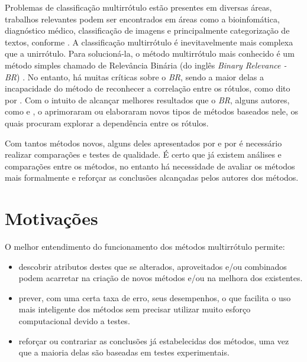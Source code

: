 Problemas de classificação multirrótulo estão presentes em diversas áreas, trabalhos relevantes podem
ser encontrados em áreas como a bioinfomática, diagnóstico médico, classificação de imagens e principalmente
categorização de textos, conforme \cite{carvalho2009}. A classificação multirrótulo é inevitavelmente
mais complexa que a unirrótulo. Para solucioná-la, o método multirrótulo mais conhecido é um método simples chamado de
Relevância Binária (do inglês \textit{Binary Relevance - BR}) \cite{carvalho2009}. 
No entanto, há muitas críticas sobre o \textit{BR}, sendo a maior delas a incapacidade do método de reconhecer
a correlação entre os rótulos, como dito por \cite{pcc2010}.
Com o intuito de alcançar melhores resultados que o \textit{BR}, alguns autores, como \cite{cc2009} e \cite{dbr2014},
o aprimoraram ou elaboraram novos tipos de métodos baseados nele,
os quais procuram explorar a dependência entre os rótulos. 

Com tantos métodos novos, alguns deles apresentados por \cite{carvalho2009}
e por \cite{cc2009} é necessário realizar comparações e testes de qualidade.
É certo que já existem análises e comparações entre os métodos,
no entanto há necessidade de avaliar os métodos mais formalmente
e reforçar as conclusões alcançadas pelos autores dos métodos.

\section{Motivações}
O melhor entendimento do funcionamento dos métodos multirrótulo permite:
\begin{itemize}
 \item descobrir atributos destes que se alterados, aproveitados
 e/ou combinados podem acarretar na criação de novos métodos e/ou na melhora dos existentes.
 \item prever, com uma certa taxa de erro, seus desempenhos, o que facilita o uso mais inteligente dos métodos
 sem precisar utilizar muito esforço computacional devido a testes.
 \item reforçar ou contrariar as conclusões já estabelecidas dos métodos, uma vez que a maioria delas são 
 baseadas em testes experimentais.
\end{itemize}

